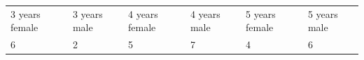\begin{enumerate}[noitemsep, label=\textbf{\arabic*}. ]
{{\begin{center}
{        \hline
      }
      \tablelasttail{}
      \begin{xtabular}[t]{|l|l|l|l|l|l|}\hline
        3 years
female &
        3 years male &
        4 years female &
        4
years male &
        5 years female &
        5 years male%
     \tabularnewline{}
        6 &
        2 &
        5 &
        7 &
        4 &
        6%

\end{xtabular}
\end{center}}}
\end{enumerate}
